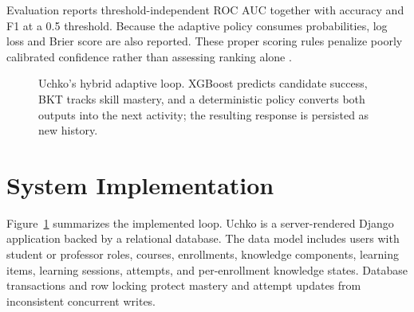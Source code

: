 \documentclass[conference]{IEEEtran}
\begin{document}
Evaluation reports threshold-independent ROC AUC together with accuracy and F1 at a 0.5 threshold. Because the adaptive policy consumes probabilities, log loss and Brier score are also reported. These proper scoring rules penalize poorly calibrated confidence rather than assessing ranking alone \cite{brier1950verification}.

\begin{figure}[t]
\centering
{}
\caption{Uchko's hybrid adaptive loop. XGBoost predicts candidate success, BKT tracks skill mastery, and a deterministic policy converts both outputs into the next activity; the resulting response is persisted as new history.}
\label{fig:architecture}
\end{figure}

\section{System Implementation}
Figure~\ref{fig:architecture} summarizes the implemented loop. Uchko is a server-rendered Django application backed by a relational database. The data model includes users with student or professor roles, courses, enrollments, knowledge components, learning items, learning sessions, attempts, and per-enrollment knowledge states. Database transactions and row locking protect mastery and attempt updates from inconsistent concurrent writes.
\end{document}
